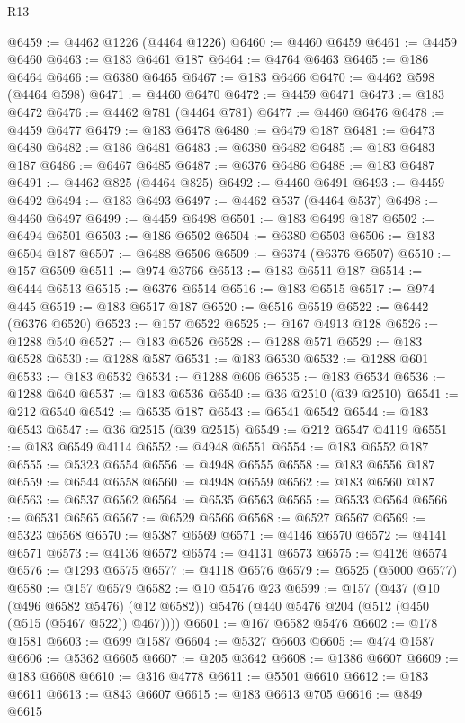 \begin{lexlean}{R13}
\begin{coremodule}
@6459 := @4462 @1226 (@4464 @1226)
@6460 := @4460 @6459
@6461 := @4459 @6460
@6463 := @183 @6461 @187
@6464 := @4764 @6463
@6465 := @186 @6464
@6466 := @6380 @6465
@6467 := @183 @6466
@6470 := @4462 @598 (@4464 @598)
@6471 := @4460 @6470
@6472 := @4459 @6471
@6473 := @183 @6472
@6476 := @4462 @781 (@4464 @781)
@6477 := @4460 @6476
@6478 := @4459 @6477
@6479 := @183 @6478
@6480 := @6479 @187
@6481 := @6473 @6480
@6482 := @186 @6481
@6483 := @6380 @6482
@6485 := @183 @6483 @187
@6486 := @6467 @6485
@6487 := @6376 @6486
@6488 := @183 @6487
@6491 := @4462 @825 (@4464 @825)
@6492 := @4460 @6491
@6493 := @4459 @6492
@6494 := @183 @6493
@6497 := @4462 @537 (@4464 @537)
@6498 := @4460 @6497
@6499 := @4459 @6498
@6501 := @183 @6499 @187
@6502 := @6494 @6501
@6503 := @186 @6502
@6504 := @6380 @6503
@6506 := @183 @6504 @187
@6507 := @6488 @6506
@6509 := @6374 (@6376 @6507)
@6510 := @157 @6509
@6511 := @974 @3766
@6513 := @183 @6511 @187
@6514 := @6444 @6513
@6515 := @6376 @6514
@6516 := @183 @6515
@6517 := @974 @445
@6519 := @183 @6517 @187
@6520 := @6516 @6519
@6522 := @6442 (@6376 @6520)
@6523 := @157 @6522
@6525 := @167 @4913 @128
@6526 := @1288 @540
@6527 := @183 @6526
@6528 := @1288 @571
@6529 := @183 @6528
@6530 := @1288 @587
@6531 := @183 @6530
@6532 := @1288 @601
@6533 := @183 @6532
@6534 := @1288 @606
@6535 := @183 @6534
@6536 := @1288 @640
@6537 := @183 @6536
@6540 := @36 @2510 (@39 @2510)
@6541 := @212 @6540
@6542 := @6535 @187
@6543 := @6541 @6542
@6544 := @183 @6543
@6547 := @36 @2515 (@39 @2515)
@6549 := @212 @6547 @4119
@6551 := @183 @6549 @4114
@6552 := @4948 @6551
@6554 := @183 @6552 @187
@6555 := @5323 @6554
@6556 := @4948 @6555
@6558 := @183 @6556 @187
@6559 := @6544 @6558
@6560 := @4948 @6559
@6562 := @183 @6560 @187
@6563 := @6537 @6562
@6564 := @6535 @6563
@6565 := @6533 @6564
@6566 := @6531 @6565
@6567 := @6529 @6566
@6568 := @6527 @6567
@6569 := @5323 @6568
@6570 := @5387 @6569
@6571 := @4146 @6570
@6572 := @4141 @6571
@6573 := @4136 @6572
@6574 := @4131 @6573
@6575 := @4126 @6574
@6576 := @1293 @6575
@6577 := @4118 @6576
@6579 := @6525 (@5000 @6577)
@6580 := @157 @6579
@6582 := @10 @5476 @23
@6599 := @157
    (@437
      (@10 (@496 @6582 @5476) (@12 @6582))
      @5476
      (@440 @5476 @204 (@512 (@450 (@515 (@5467 @522)) @467))))
@6601 := @167 @6582 @5476
@6602 := @178 @1581
@6603 := @699 @1587
@6604 := @5327 @6603
@6605 := @474 @1587
@6606 := @5362 @6605
@6607 := @205 @3642
@6608 := @1386 @6607
@6609 := @183 @6608
@6610 := @316 @4778
@6611 := @5501 @6610
@6612 := @183 @6611
@6613 := @843 @6607
@6615 := @183 @6613 @705
@6616 := @849 @6615

\end{coremodule}
\end{lexlean}
